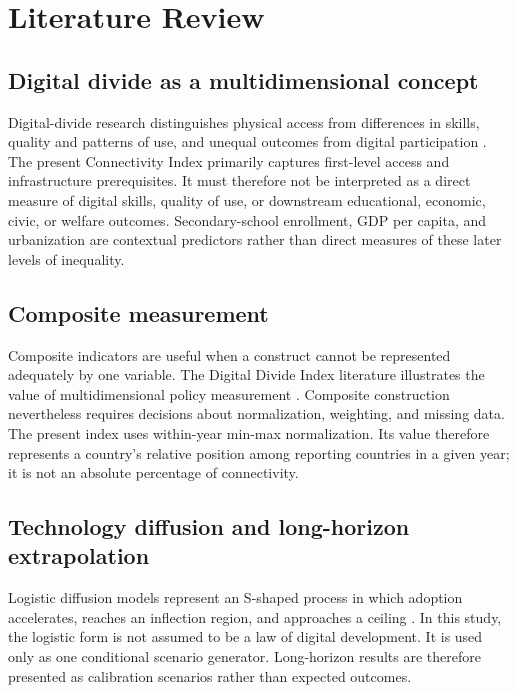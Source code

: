\documentclass[conference]{IEEEtran}
\begin{document}
\section{Literature Review}

\subsection{Digital divide as a multidimensional concept}

Digital-divide research distinguishes physical access from differences in skills, quality and patterns of use, and unequal outcomes from digital participation \cite{ragnedda,hustad}. The present Connectivity Index primarily captures first-level access and infrastructure prerequisites. It must therefore not be interpreted as a direct measure of digital skills, quality of use, or downstream educational, economic, civic, or welfare outcomes. Secondary-school enrollment, GDP per capita, and urbanization are contextual predictors rather than direct measures of these later levels of inequality.

\subsection{Composite measurement}

Composite indicators are useful when a construct cannot be represented adequately by one variable. The Digital Divide Index literature illustrates the value of multidimensional policy measurement \cite{parkkim}. Composite construction nevertheless requires decisions about normalization, weighting, and missing data. The present index uses within-year min-max normalization. Its value therefore represents a country's relative position among reporting countries in a given year; it is not an absolute percentage of connectivity.

\subsection{Technology diffusion and long-horizon extrapolation}

Logistic diffusion models represent an S-shaped process in which adoption accelerates, reaches an inflection region, and approaches a ceiling \cite{kaminski}. In this study, the logistic form is not assumed to be a law of digital development. It is used only as one conditional scenario generator. Long-horizon results are therefore presented as calibration scenarios rather than expected outcomes.
\end{document}
